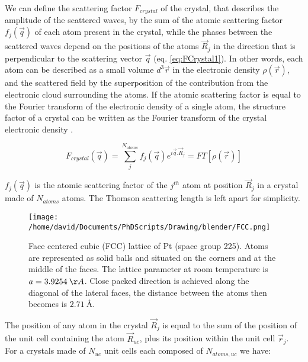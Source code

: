 We can define the scattering factor $F_{crystal}$ of the crystal, that describes the amplitude of the scattered waves, by the sum of the atomic scattering factor $f_j(\vec{q})$ of each atom present in the crystal, while the phases between the scattered waves depend on the positions of the atoms $\vec{R}_j$ in the direction that is perpendicular to the scattering vector $\vec{q}$ (eq. \ref{eq:FCrystal1}).
In other words, each atom can be described as a small volume $d^3\vec{r}$ in the electronic density $\rho(\vec{r})$, and the scattered field by the superposition of the contribution from the electronic cloud surrounding the atoms.
If the atomic scattering factor is equal to the Fourier transform of the electronic density of a single atom, the structure factor of a crystal can be written as the Fourier transform of the crystal electronic density \parencite{Paganin}.

\begin{equation}
    \label{eq:FCrystal1}
    F_{crystal}(\vec{q}) = \sum_j^{N_{atoms}} f_j(\vec{q}) e^{i\vec{q}.\vec{R}_j} = FT[\rho(\vec{r})]
\end{equation}

$f_j(\vec{q})$ is the atomic scattering factor of the $j^{th}$ atom at position $\vec{R}_j$ in a crystal made of $N_{atoms}$ atoms.
The Thomson scattering length is left apart for simplicity.

\begin{figure}[!htb]
    \centering
    \texttt{[image: /home/david/Documents/PhDScripts/Drawing/blender/FCC.png]}
    \caption{Face centered cubic (FCC) lattice of Pt (space group 225). Atoms are represented as solid balls and situated on the corners and at the middle of the faces. The lattice parameter at room temperature is $a = 3.9254 \:\AA$. Close packed direction is achieved along the diagonal of the lateral faces, the distance between the atoms then becomes is $2.71 \:\si{\angstrom}.$}
    \label{fig:fcc}
\end{figure}

The position of any atom in the crystal $\vec{R}_j$ is equal to the sum of the position of the unit cell containing the atom $\vec{R}_{uc}$, plus its position within the unit cell $\vec{r}_j$.
For a crystals made of $N_{uc}$ unit cells each composed of $N_{atoms,uc}$ we have:

